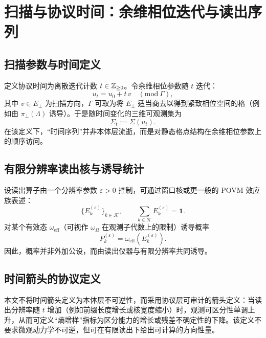 \section{扫描与协议时间：余维相位迭代与读出序列}

\subsection{扫描参数与时间定义}

定义协议时间为离散迭代计数 $t\in\mathbb{Z}_{\ge 0}$。令余维相位参数随 $t$ 迭代：
\[
u_t=u_{0}+t\,v\quad (\mathrm{mod}\ \Gamma),
\]
其中 $v\in E_{\perp}$ 为扫描方向，$\Gamma$ 可取为将 $E_{\perp}$ 适当商去以得到紧致相位空间的格（例如由 $\pi_{\perp}(\Lambda)$ 诱导）。于是随时间变化的三维可观测集为
\[
\Sigma_t := \Sigma(u_t).
\]
在该定义下，“时间序列”并非本体层流逝，而是对静态格点结构在余维相位参数上的顺序访问。

\subsection{有限分辨率读出核与诱导统计}

设读出算子由一个分辨率参数 $\varepsilon>0$ 控制，可通过窗口核或更一般的 POVM 效应族表述：
\[
\big\{E_k^{(\varepsilon)}\big\}_{k\in \mathcal{K}},\qquad \sum_{k\in\mathcal{K}}E_k^{(\varepsilon)}=\mathbf{1}.
\]
对某个有效态 $\omega_{\mathrm{eff}}$（可视作 $\omega_\Omega$ 在观测子代数上的限制）诱导概率
\[
P_k^{(\varepsilon)}=\omega_{\mathrm{eff}}\!\left(E_k^{(\varepsilon)}\right).
\]
因此，概率并非外加公设，而由读出仪器与有限分辨率共同诱导。

\subsection{时间箭头的协议定义}

本文不将时间箭头定义为本体层不可逆性，而采用协议层可审计的箭头定义：当读出分辨率随 $t$ 增加（例如前缀长度增长或核宽度缩小）时，观测可区分性单调上升，从而可定义“熵增样”指标为区分能力的增长或残差不确定性的下降。该定义不要求微观动力学不可逆，但可在有限读出下给出可计算的方向性量。

